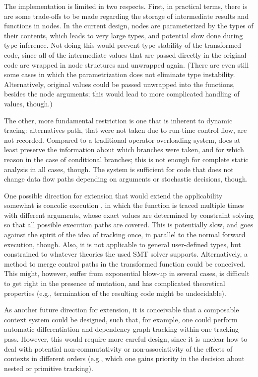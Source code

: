 The implementation is limited in two respects.  First, in practical terms, there is are some
trade-offs to be made regarding the storage of intermediate results and functions in nodes.  In the
current design, nodes are parameterized by the types of their contents, which leads to very large
types, and potential slow done during type inference.  Not doing this would prevent type stability
of the transformed code, since all of the intermediate values that are passed directly in the
original code are wrapped in node structures and unwrapped again.  (There are even still some cases
in which the parametrization does not eliminate type instability.  Alternatively, original values
could be passed unwrapped into the  functions, besides the node arguments; this
would lead to more complicated handling of values, though.)

The other, more fundamental restriction is one that is inherent to dynamic tracing: alternatives
path, that were not taken due to run-time control flow, are not recorded.  Compared to a traditional
operator overloading system, \irtrackerjl{} does at least preserve the information about which
branches were taken, and for which reason in the case of conditional branches; this is not enough
for complete static analysis in all cases, though.  The system is sufficient for code that does not
change data flow paths depending on arguments or stochastic decisions, though.

One possible direction for extension that would extend the applicability somewhat is concolic
execution \parencite{zeller2019concolic}, in which the function is traced multiple times with
different arguments, whose exact values are determined by constraint solving so that all possible
execution paths are covered.  This is potentially slow, and goes against the spirit of the idea of
tracking once, in parallel to the normal forward execution, though.  Also, it is not applicable to
general user-defined types, but constrained to whatever theories the used SMT solver supports.
Alternatively, a method to merge control paths in the transformed function could be conceived.  This
might, however, suffer from exponential blow-up in several cases, is difficult to get right in the
presence of mutation, and has complicated theoretical properties (e.g., termination of the resulting
code might be undecidable).

As another future direction for extension, it is conceivable that a composable context system could
be designed, such that, for example, one could perform automatic differentiation and dependency
graph tracking within one tracking pass.  However, this would require more careful design, since it
is unclear how to deal with potential non-commutativity or non-associativity of the effects of
contexts in different orders (e.g., which one gains priority in the decision about nested or
primitive tracking).


